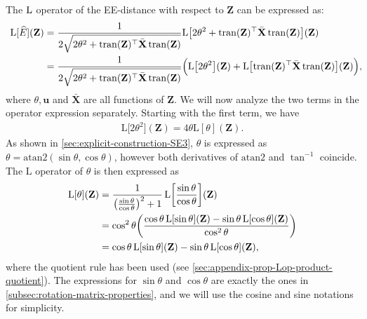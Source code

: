 The $\operatorname{L}$ operator of the EE-distance with respect to $\mathbf{Z}$ can be expressed as:
\begin{align}
    \begin{split}
        \text{L}[\widehat{E}](\mathbf{Z}) &=  \frac{1}{2\sqrt{2\theta^2 + \operatorname{tran}(\mathbf{Z})^\top\bar{\mathbf{X}}\operatorname{tran}(\mathbf{Z})}} \text{L}\bigl[2\theta^2 + \operatorname{tran}(\mathbf{Z})^\top\bar{\mathbf{X}}\operatorname{tran}(\mathbf{Z})\bigr](\mathbf{Z}) \\
        &= \frac{1}{2\sqrt{2\theta^2 + \operatorname{tran}(\mathbf{Z})^\top\bar{\mathbf{X}}\operatorname{tran}(\mathbf{Z})}} \Bigl(\text{L}\bigl[2\theta^2\bigr](\mathbf{Z}) + \text{L}\bigl[\operatorname{tran}(\mathbf{Z})^\top\bar{\mathbf{X}}\operatorname{tran}(\mathbf{Z})\bigr](\mathbf{Z})\Bigr),\!\!\!\!\! \label{eq:explicit-derivative-SE3-LdhatZ-firststep}
    \end{split}
\end{align}
where $\theta, \mathbf{u}$ and $\bar{\mathbf{X}}$ are all functions of $\mathbf{Z}$. We will now analyze the two terms in the operator expression separately. Starting with the first term, we have
\begin{align}
    \text{L}\bigl[2\theta^2\bigr](\mathbf{Z}) = 4\theta \text{L}[\theta](\mathbf{Z}).
\end{align}
As shown in \cref{sec:explicit-construction-SE3}, $\theta$ is expressed as $\theta=\text{atan2}(\sin\theta, \cos\theta)$, however both derivatives of $\text{atan2}$ and $\tan^{-1}$ coincide. The $\text{L}$ operator of $\theta$ is then expressed as
\begin{align}
    \text{L}[\theta](\mathbf{Z}) &= \frac{1}{\bigl(\frac{\sin\theta}{\cos\theta}\bigr)^2+1} \operatorname{L}\biggl[\frac{\sin\theta}{\cos\theta}\biggr] (\mathbf{Z})\\ 
    &=\cos^2\theta\biggl(\frac{\cos\theta\operatorname{L}[\sin\theta](\mathbf{Z}) - \sin\theta\operatorname{L}[\cos\theta](\mathbf{Z})}{\cos^2\theta}\biggr)\\
    &= \cos\theta\operatorname{L}[\sin\theta](\mathbf{Z}) - \sin\theta\operatorname{L}[\cos\theta](\mathbf{Z}),
    \label{eq:explicit-derivative-SE3-LthetaZ}
\end{align}
where the quotient rule has been used (see \cref{sec:appendix-prop-Lop-product-quotient}). The expressions for $\sin\theta$ and $\cos\theta$ are exactly the ones in \cref{subsec:rotation-matrix-properties}, and we will use the cosine and sine notations for simplicity.

